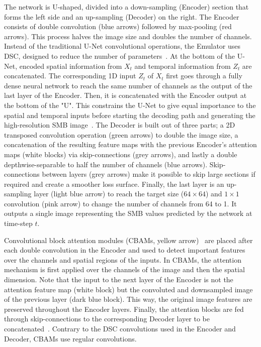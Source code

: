 \documentclass[a4paper,11pt,oneside]{report}
\begin{document}
The network is U-shaped, divided into a down-sampling (Encoder) section that forms the left side and an up-sampling (Decoder) on the right. The Encoder consists of double convolution (blue arrows) followed by max-pooling (red arrows). This process halves the image size and doubles the number of channels. Instead of the traditional U-Net convolutional operations, the Emulator uses DSC, designed to reduce the number of parameters~\cite{smatunet}. At the bottom of the U-Net, encoded spatial information from $X_t$ and temporal information from $Z_t$ are concatenated. The corresponding 1D input $Z_t$ of $X_t$ first goes through a fully dense neural network to reach the same number of channels as the output of the last layer of the Encoder. Then, it is concatenated with the Encoder output at the bottom of the "U". This constrains the U-Net to give equal importance to the spatial and temporal inputs before starting the decoding path and generating the high-resolution SMB image~\cite{Doury}. The Decoder is built out of three parts; a 2D transposed convolution operation (green arrows) to double the image size, a concatenation of the resulting feature maps with the previous Encoder's attention maps (white blocks) via skip-connections (grey arrows), and lastly a double depthwise-separable to half the number of channels (blue arrows). Skip-connections between layers (grey arrows) make it possible to skip large sections if required and create a smoother loss surface. Finally, the last layer is an up-sampling layer (light blue arrow) to reach the target size ($64\times 64$) and $1\times1$ convolution (pink arrow) to change the number of channels from 64 to 1. It outputs a single image representing the SMB values predicted by the network at time-step $t$.

Convolutional block attention modules (CBAMs, yellow arrow)~\cite{smatunet} are placed after each double convolution in the Encoder and used to detect important features over the channels and spatial regions of the inputs. In CBAMs, the attention mechanism is first applied over the channels of the image and then the spatial dimension. Note that the input to the next layer of the Encoder is not the attention feature map (white block) but the convoluted and downsampled image of the previous layer (dark blue block). This way, the original image features are preserved throughout the Encoder layers. Finally, the attention blocks are fed through skip-connections to the corresponding Decoder layer to be concatenated~\cite{smatunet}. Contrary to the DSC convolutions used in the Encoder and Decoder, CBAMs use regular convolutions.  
\end{document}
